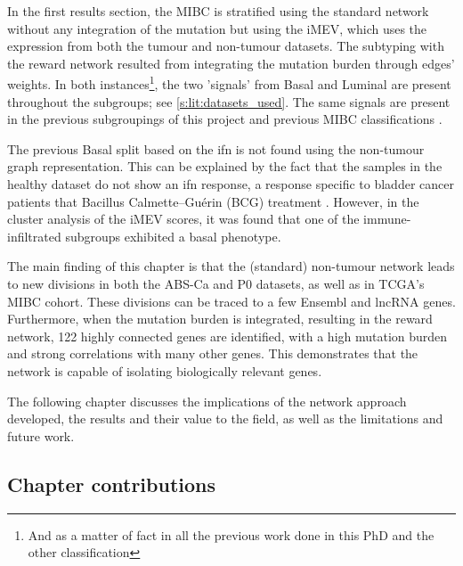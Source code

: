 In the first results section, the MIBC is stratified using the standard network without any integration of the mutation but using the iMEV, which uses the expression from both the tumour and non-tumour datasets. The subtyping with the reward network resulted from integrating the mutation burden through edges' weights. In both instances\footnote{And as a matter of fact in all the previous work done in this PhD and the other classification}, the two 'signals' from Basal and Luminal are present throughout the subgroups; see \cref{s:lit:datasets_used}. The same signals are present in the previous subgroupings of this project and previous MIBC classifications \citep{Robertson2017-mg,Kamoun2020-tj,Marzouka2018-ge}.

The previous Basal split based on the \acrlong{ifn} is not found using the non-tumour graph representation. This can be explained by the fact that the samples in the healthy dataset do not show an \acrshort{ifn} response, a response specific to bladder cancer patients that Bacillus Calmette–Guérin (BCG) treatment \citep{Baker2022-bj}. However,  in the cluster analysis of the iMEV scores, it was found that one of the immune-infiltrated subgroups exhibited a basal phenotype.

The main finding of this chapter is that the (standard) non-tumour network leads to new divisions in both the ABS-Ca and P0 datasets, as well as in TCGA's MIBC cohort. These divisions can be traced to a few Ensembl and lncRNA genes. Furthermore, when the mutation burden is integrated, resulting in the reward network, 122 highly connected genes are identified, with a high mutation burden and strong correlations with many other genes. This demonstrates that the network is capable of isolating biologically relevant genes.

The following chapter discusses the implications of the network approach developed, the results and their value to the field, as well as the limitations and future work.

\subsection{Chapter contributions}

